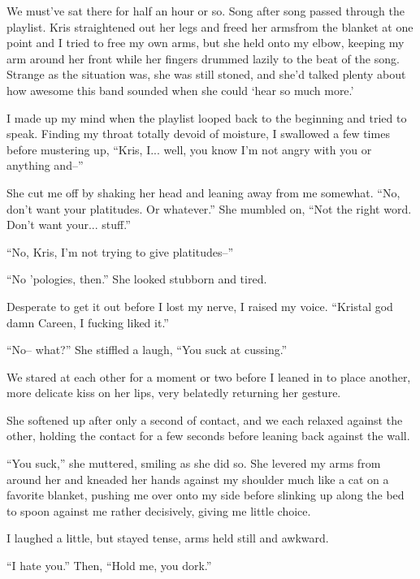 We must've sat there for half an hour or so.  Song after song passed through the playlist.  Kris straightened out her legs and freed her armsfrom the blanket at one point and I tried to free my own arms, but she held onto my elbow, keeping my arm around her front while her fingers drummed lazily to the beat of the song.  Strange as the situation was, she was still stoned, and she'd talked plenty about how awesome this band sounded when she could `hear so much more.'

I made up my mind when the playlist looped back to the beginning and tried to speak.  Finding my throat totally devoid of moisture, I swallowed a few times before mustering up, ``Kris, I... well, you know I'm not angry with you or anything and--''

She cut me off by shaking her head and leaning away from me somewhat.  ``No, don't want your platitudes.  Or whatever.''  She mumbled on, ``Not the right word.  Don't want your... stuff.''

``No, Kris, I'm not trying to give platitudes--''

``No 'pologies, then.''  She looked stubborn and tired.

Desperate to get it out before I lost my nerve, I raised my voice.  ``Kristal god damn Careen, I fucking liked it.''

``No-- what?''  She stiffled a laugh, ``You suck at cussing.''

We stared at each other for a moment or two before I leaned in to place another, more delicate kiss on her lips, very belatedly returning her gesture.

She softened up after only a second of contact, and we each relaxed against the other, holding the contact for a few seconds before leaning back against the wall.

``You suck,'' she muttered, smiling as she did so.  She levered my arms from around her and kneaded her hands against my shoulder much like a cat on a favorite blanket, pushing me over onto my side before slinking up along the bed to spoon against me rather decisively, giving me little choice.

I laughed a little, but stayed tense, arms held still and awkward.

``I hate you.''  Then, ``Hold me, you dork.''
